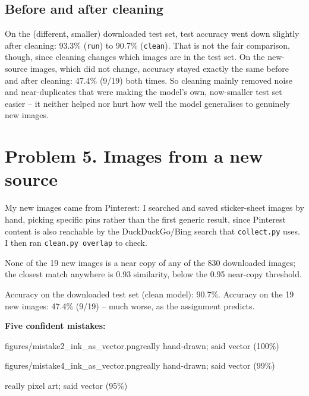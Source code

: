 \documentclass[11pt]{article}
\begin{document}
\subsection*{Before and after cleaning}

On the (different, smaller) downloaded test set, test accuracy went down
slightly after cleaning: 93.3\% (\texttt{run}) to 90.7\% (\texttt{clean}).
That is not the fair comparison, though, since cleaning changes which images
are in the test set. On the new-source images, which did not change, accuracy
stayed exactly the same before and after cleaning: 47.4\% (9/19) both times.
So cleaning mainly removed noise and near-duplicates that were making the
model's own, now-smaller test set easier -- it neither helped nor hurt how
well the model generalises to genuinely new images.

\section*{Problem 5. Images from a new source}

My new images came from Pinterest: I searched and saved sticker-sheet images
by hand, picking specific pins rather than the first generic result, since
Pinterest content is also reachable by the DuckDuckGo/Bing search that
\texttt{collect.py} uses. I then ran \texttt{clean.py overlap} to check.


None of the 19 new images is a near copy of any of the 830 downloaded
images; the closest match anywhere is 0.93 similarity, below the 0.95
near-copy threshold.

Accuracy on the downloaded test set (clean model): 90.7\%. Accuracy on the 19
new images: 47.4\% (9/19) -- much worse, as the assignment predicts.

\textbf{Five confident mistakes:}

           {figures/mistake2_ink_as_vector.png}{really hand-drawn; said vector (100\%)}

           {figures/mistake4_ink_as_vector.png}{really hand-drawn; said vector (99\%)}

\begin{center}\end{center}
really pixel art; said vector (95\%)
\end{document}
